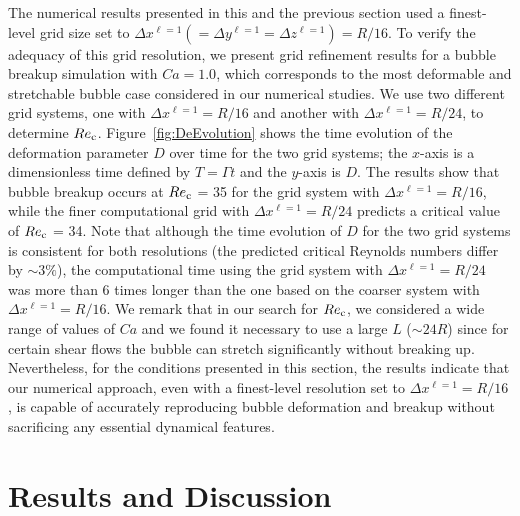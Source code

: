 \documentclass[%
 reprint,
 showkeys,
 amsmath,amssymb,
 aps,
 prfluids,
 onecolumn
]{revtex4-2}
\begin{document}
The numerical results presented in this and the previous section used a
finest-level grid size set to $\Delta x^{\ell=1}(= \Delta y^{\ell=1}= \Delta
z^{\ell=1})=R/16$. To verify the adequacy of this grid resolution, we present
grid refinement results for a bubble breakup simulation with $Ca=1.0$, which
corresponds to the most deformable and stretchable bubble case considered in
our numerical studies. We use two different grid systems, one with $\Delta
x^{\ell=1}=R/16$ and another with $\Delta x^{\ell=1}=R/24$, to determine
$Re_{\rm c}$.  Figure~\ref{fig:DeEvolution} shows the time evolution of the
deformation parameter {\color{red} $D$} over time for the two grid systems; the $x$-axis is
a dimensionless time defined by $T=\mathit{\Gamma} t$ and the $y$-axis is {\color{red} $D$}.
The results show that bubble breakup occurs at $Re_{\rm c}$ = 35 for the grid system
with $\Delta x^{\ell=1}=R/16$, while the finer computational grid with $\Delta
x^{\ell=1}=R/24$ predicts a critical value of $Re_{\rm c}$ = 34.  Note that although
the time evolution of {\color{red} $D$} for the two grid systems is consistent for both
resolutions (the predicted critical Reynolds numbers differ by $\sim 3\%$), the
computational time using the grid system with $\Delta x^{\ell=1}=R/24$ was more
than 6 times longer than the one based on the coarser system with $\Delta
x^{\ell=1}=R/16$.  We remark that in our search for $Re_{\rm c}$, we considered a
wide range of values of $Ca$ and we found it necessary to use a large $L$
($\sim 24R$) since for certain shear flows the bubble can stretch significantly
without breaking up.  Nevertheless, for the conditions presented in this
section, the results indicate that our numerical approach, even with a
finest-level resolution set to $\Delta x^{\ell=1}=R/16$, is capable of
accurately reproducing bubble deformation and breakup without sacrificing any
essential dynamical features.


\section{Results and Discussion}
\end{document}
